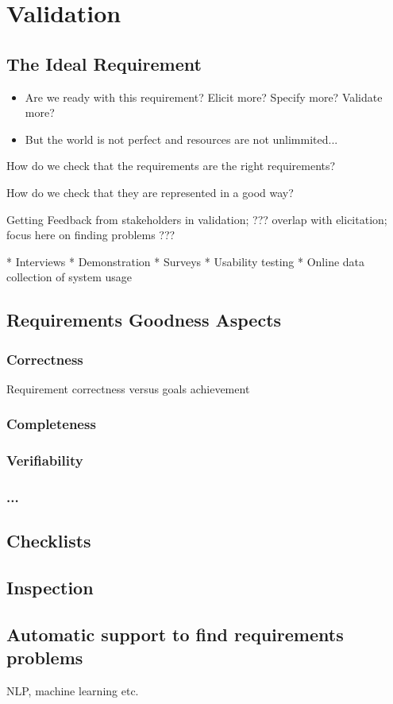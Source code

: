
\chapter{Validation}

\section{The Ideal Requirement}
\begin{itemize}
  \item Are we ready with this requirement? Elicit more? Specify more? Validate more?
  \item But the world is not perfect and resources are not unlimmited...
\end{itemize}


How do we check that the requirements are the right requirements?

How do we check that they are represented in a good way?

Getting Feedback from stakeholders in validation; ??? overlap with elicitation; focus here on finding problems ???

* Interviews
* Demonstration
* Surveys
* Usability testing
* Online data collection of system usage



\section{Requirements Goodness Aspects}



\subsection{Correctness}

Requirement correctness versus goals achievement

\subsection{Completeness}

\subsection{Verifiability}

\subsection{...}


\section{Checklists}

\section{Inspection}

\section{Automatic support to find requirements problems}

NLP, machine learning etc.
